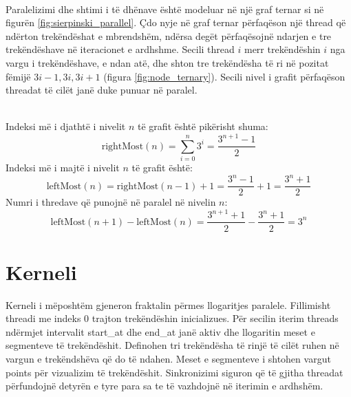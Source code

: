 \noindent \\ Paralelizimi dhe shtimi i të dhënave është modeluar në një graf ternar si në figurën \ref{fig:sierpinski_parallel}. Çdo nyje në graf ternar përfaqëson një thread që ndërton trekëndëshat e mbrendshëm, ndërsa degët përfaqësojnë ndarjen e tre trekëndëshave në iteracionet e ardhshme. Secili thread \(i\)  merr trekëndëshin \(i\) nga vargu i trekëndëshave, e ndan atë, dhe shton tre trekëndësha të ri në pozitat  fëmijë \(3i-1,3i,3i+1\) (figura \ref{fig:node_ternary}). Secili nivel i grafit përfaqëson threadat të cilët janë duke punuar në paralel. 

\noindent \\ Indeksi më i djathtë i nivelit \(n\) të grafit është pikërisht shuma:
\[
\text{rightMost}(n) = \sum_{i=0}^n 3^i = \frac{3^{n+1} - 1}{2}
\]
\noindent Indeksi më i majtë i nivelit \(n\) të grafit është:
\[
\text{leftMost}(n) = \text{rightMost}(n-1) + 1 = \frac{3^n - 1}{2} + 1 = \frac{3^n + 1}{2}
\]
\noindent Numri i thredave që punojnë në paralel në nivelin \(n\):
\[
\text{leftMost}(n+1) - \text{leftMost}(n) = \frac{3^{n+1} + 1}{2} - \frac{3^n + 1}{2} = 3^n
\]

\section{Kerneli}

Kerneli i mëposhtëm gjeneron fraktalin përmes llogaritjes paralele. Fillimisht threadi me indeks 0 trajton trekëndëshin inicializues. Për secilin iterim threads ndërmjet intervalit start\_at dhe end\_at janë aktiv dhe llogaritin meset e segmenteve të trekëndëshit. Definohen tri trekëndësha të rinjë të cilët ruhen në vargun e trekëndshëva që do të ndahen. Meset e segmenteve i shtohen vargut points për vizualizim të trekëndëshit. Sinkronizimi siguron që të gjitha threadat përfundojnë detyrën e tyre para sa te të vazhdojnë në iterimin e ardhshëm.  \\

